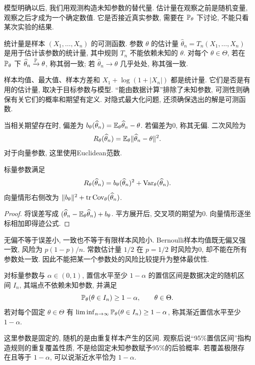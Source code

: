 模型明确以后, 我们用观测构造未知参数的替代量. 估计量在观察之前是随机变量, 观察之后才成为一个确定数值. 它是否接近真实参数, 需要在 $\mathbb P_\theta$ 下讨论, 不能只看某次实验的结果.

\begin{definition}[统计量与估计量]
统计量是样本 $(X_1,\ldots,X_n)$ 的可测函数. 参数 $\theta$ 的估计量 $\widehat\theta_n=T_n(X_1,\ldots,X_n)$ 是用于估计该参数的统计量, 其中规则 $T_n$ 不能依赖未知的 $\theta$. 对每个 $\theta\in\Theta$, 若在 $\mathbb P_\theta$ 下 $\widehat\theta_n\xrightarrow{\mathbb P}\theta$, 称其弱一致; 若 $\widehat\theta_n\to\theta$ 几乎处处, 称其强一致.
\end{definition}
样本均值、最大值、样本方差和 $X_1+\log(1+|X_n|)$ 都是统计量. 它们是否是有用的估计量, 取决于目标参数与模型. “能由数据计算”排除了未知参数, 可测性则确保有关它们的概率和期望有定义. 对隐式最大化问题, 还须确保选出的解是可测函数.

\begin{definition}[偏差与二次风险]
当相关期望存在时, 偏差为 $b_\theta(\widehat\theta_n)=\mathbb E_\theta\widehat\theta_n-\theta$. 若偏差为0, 称其无偏. 二次风险为
\[
 R_\theta(\widehat\theta_n)=\mathbb E_\theta\lVert \widehat\theta_n-\theta\rVert^2.
\]
对于向量参数, 这里使用Euclidean范数.
\end{definition}
\begin{proposition}[偏差与方差分解]
标量参数满足
\[
 R_\theta(\widehat\theta_n)=b_\theta(\widehat\theta_n)^2+\operatorname{Var}_\theta(\widehat\theta_n).
\]
向量情形右侧改为 $\lVert b_\theta\rVert^2+\operatorname{tr}\operatorname{Cov}_\theta(\widehat\theta_n)$.
\end{proposition}
\begin{proof}
将误差写成 $(\widehat\theta_n-\mathbb E_\theta\widehat\theta_n)+b_\theta$. 平方展开后, 交叉项的期望为0. 向量情形逐坐标相加即得迹公式.
\end{proof}
无偏不等于误差小, 一致也不等于有限样本风险小. Bernoulli样本均值既无偏又强一致, 风险为 $p(1-p)/n$. 常数估计量 $1/2$ 在 $p=1/2$ 时风险为0, 却不能在所有参数处一致. 因此不能把某一个参数处的风险比较提升为整体最优性.

\begin{definition}[置信区间]
对标量参数与 $\alpha\in(0,1)$, 置信水平至少 $1-\alpha$ 的置信区间是数据决定的随机区间 $I_n$, 其端点不依赖未知参数, 并满足
\[
 \mathbb P_\theta(\theta\in I_n)\ge1-\alpha,\qquad\theta\in\Theta.
\]
若对每个固定 $\theta\in\Theta$ 有
$\liminf_{n\to\infty}\mathbb P_\theta(\theta\in I_n)\ge1-\alpha$, 称其渐近置信水平至少 $1-\alpha$.
\end{definition}
这里参数是固定的, 随机的是由重复样本产生的区间. 观察后说“95\%置信区间”指构造规则的重复覆盖性质, 不是给固定未知参数赋予95\%的后验概率. 若覆盖极限存在且等于 $1-\alpha$, 可以说渐近水平恰为 $1-\alpha$.

